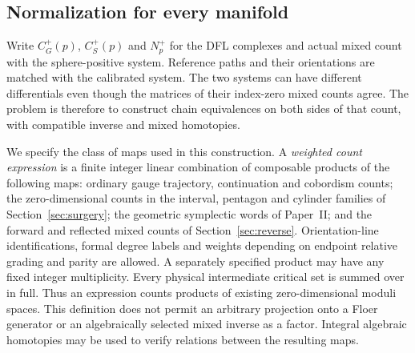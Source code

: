 \documentclass[11pt]{amsart}
\theoremstyle{definition}
\theoremstyle{remark}
\theoremstyle{plain}
\begin{document}
\subsection{Normalization for every manifold}
Write $C_G^+(p)$, $C_S^+(p)$ and $N_p^+$ for the DFL complexes
and actual mixed count with the sphere-positive system. Reference
paths and their orientations are matched with the calibrated system.
The two systems can have different differentials even though the
matrices of their index-zero mixed counts agree. The problem is
therefore to construct chain equivalences on both sides of that
count, with compatible inverse and mixed homotopies.

We specify the class of maps used in this construction. A
\emph{weighted count expression} is a finite integer linear
combination of composable products of the following maps:
ordinary gauge trajectory, continuation and cobordism counts;
the zero-dimensional counts in the interval, pentagon and cylinder
families of Section~\ref{sec:surgery}; the geometric symplectic
words of Paper~II; and the forward and reflected mixed counts of
Section~\ref{sec:reverse}. Orientation-line identifications,
formal degree labels and weights depending on endpoint relative
grading and parity are allowed. A separately specified product
may have any fixed integer multiplicity. Every physical
intermediate critical set is summed over in full.
Thus an expression counts products of existing zero-dimensional
moduli spaces. This definition does not permit an arbitrary
projection onto a Floer generator or an algebraically selected
mixed inverse as a factor. Integral algebraic homotopies may be
used to verify relations between the resulting maps.
\end{document}
